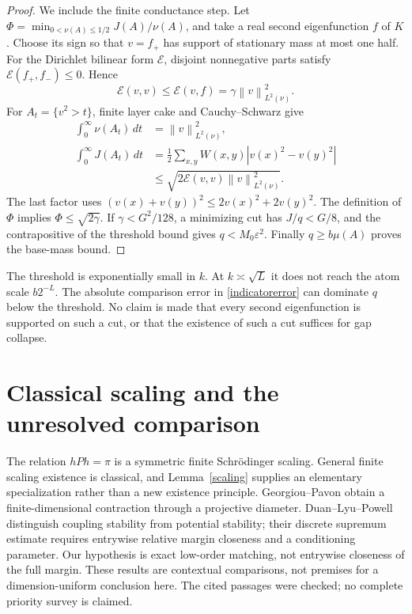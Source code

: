 \documentclass[11pt]{article}
\newcommand{\norm}[1]{\left\|#1\right\|}
\begin{document}
\begin{proof}
We include the finite conductance step. Let $\Phi=\min_{0<\nu(A)\leq1/2}J(A)/\nu(A)$, and take a real second eigenfunction $f$ of $K$. Choose its sign so that $v=f_+$ has support of stationary mass at most one half. For the Dirichlet bilinear form $\mathcal E$, disjoint nonnegative parts satisfy $\mathcal E(f_+,f_-)\leq0$. Hence
\[
 \mathcal E(v,v)\leq\mathcal E(v,f)=\gamma\norm v_{L^2(\nu)}^2.
\]
For $A_t=\{v^2>t\}$, finite layer cake and Cauchy--Schwarz give
\begin{align*}
 \int_0^\infty\nu(A_t)\,dt&=\norm v_{L^2(\nu)}^2,\\
 \int_0^\infty J(A_t)\,dt
 &=\tfrac12\sum_{x,y}W(x,y)|v(x)^2-v(y)^2|\\
 &\leq\sqrt{2\mathcal E(v,v)\norm v_{L^2(\nu)}^2}.
\end{align*}
The last factor uses $(v(x)+v(y))^2\leq2v(x)^2+2v(y)^2$. The definition of $\Phi$ implies $\Phi\leq\sqrt{2\gamma}$. If $\gamma<G^2/128$, a minimizing cut has $J/q<G/8$, and the contrapositive of the threshold bound gives $q<M_0\varepsilon^2$. Finally $q\geq b\mu(A)$ proves the base-mass bound.
\end{proof}

The threshold is exponentially small in $k$. At $k\asymp\sqrt L$ it does not reach the atom scale $b2^{-L}$. The absolute comparison error in \eqref{indicatorerror} can dominate $q$ below the threshold. No claim is made that every second eigenfunction is supported on such a cut, or that the existence of such a cut suffices for gap collapse.



\section{Classical scaling and the unresolved comparison}
The relation $hPh=\pi$ is a symmetric finite Schr\"odinger scaling. General finite scaling existence is classical, and Lemma~\ref{scaling} supplies an elementary specialization rather than a new existence principle. Georgiou--Pavon \cite{gp} obtain a finite-dimensional contraction through a projective diameter. Duan--Lyu--Powell \cite[Theorems2.1--2.5]{dlp} distinguish coupling stability from potential stability; their discrete supremum estimate requires entrywise relative margin closeness and a conditioning parameter. Our hypothesis is exact low-order matching, not entrywise closeness of the full margin. These results are contextual comparisons, not premises for a dimension-uniform conclusion here. The cited passages were checked; no complete priority survey is claimed.
\end{document}
